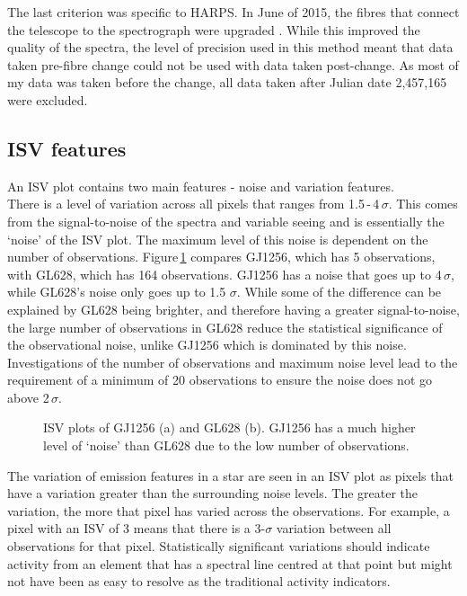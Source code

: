 The last criterion was specific to HARPS. In June of 2015, the fibres that connect the telescope to the spectrograph were upgraded \citep{2015LoCurto}. While this improved the quality of the spectra, the level of precision used in this method meant that data taken pre-fibre change could not be used with data taken post-change. As most of my data was taken before the change, all data taken after Julian date 2,457,165 were excluded.

\subsection{ISV features}
\label{secISVfeatures}
An ISV plot contains two main features - noise and variation features.\\

There is a level of variation across all pixels that ranges from 1.5\,-\,4\,$\sigma$. This comes from the signal-to-noise of the spectra and variable seeing and is essentially the `noise' of the ISV plot. The maximum level of this noise is dependent on the number of observations. Figure\,\ref{figNoise} compares GJ1256, which has 5 observations, with GL628, which has 164 observations. GJ1256 has a noise that goes up to 4\,$\sigma$, while GL628's noise only goes up to 1.5\,\,$\sigma$. While some of the difference can be explained by GL628 being brighter, and therefore having a greater signal-to-noise, the large number of observations in GL628 reduce the statistical significance of the observational noise, unlike GJ1256 which is dominated by this noise. Investigations of the number of observations and maximum noise level lead to the requirement of a minimum of 20 observations to ensure the noise does not go above 2\,$\sigma$.\\ 

\begin{figure}[!htb]
	\hspace{-3cm}
	\captionsetup{width=.8\textwidth}
    \caption{ISV plots of GJ1256 (a) and GL628 (b). GJ1256 has a much higher level of `noise' than GL628 due to the low number of observations.}
    \label{figNoise}
\end{figure}

The variation of emission features in a star are seen in an ISV plot as pixels that have a variation greater than the surrounding noise levels. The greater the variation, the more that pixel has varied across the observations. For example, a pixel with an ISV of 3 means that there is a 3-$\sigma$ variation between all observations for that pixel. Statistically significant variations should indicate activity from an element that has a spectral line centred at that point but might not have been as easy to resolve as the traditional activity indicators.\\

